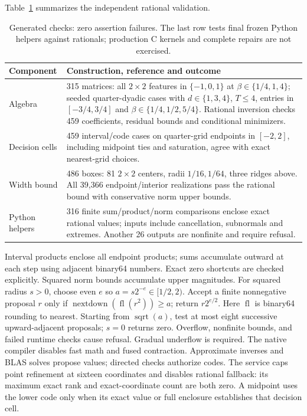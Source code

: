 \documentclass[11pt,a4paper]{article}
\makeatletter
\def\paragraph{\@startsection{paragraph}{4}{\z@}{1.5ex plus
   0.5ex minus .2ex}{-1em}{\normalsize\bf}}
\makeatother
\begin{document}
Table~\ref{tab:checks} summarizes the independent rational validation.
\begin{table}[t]
\centering\small
\begin{tabular}{@{}p{}p{}@{}}
\toprule
Component & Construction, reference and outcome \\
\midrule
Algebra & 315 matrices: all $2\!\times\!2$ features in $\{-1,0,1\}$ at
$\beta\in\{1/4,1,4\}$; seeded quarter-dyadic cases with $d\in\{1,3,4\}$,
$T\leq4$, entries in $[-3/4,3/4]$ and $\beta\in\{1/4,1/2,5/4\}$. Rational inversion checks 459 coefficients, residual bounds and
conditional minimizers. \\
Decision cells & 459 interval/code cases on quarter-grid endpoints in $[-2,2]$,
including midpoint ties and saturation, agree with exact nearest-grid choices. \\
Width bound & 486 boxes: 81 $2\!\times\!2$ centers, radii $1/16,1/64$, three
ridges above. All 39,366 endpoint/interior realizations pass the rational bound
with conservative norm upper bounds. \\
Python helpers & 316 finite sum/product/norm comparisons enclose exact rational
values; inputs include cancellation, subnormals and extremes. Another 26 outputs
are nonfinite and require refusal. \\
\bottomrule
\end{tabular}
\caption{Generated checks: zero assertion failures. The last row tests final
frozen Python helpers against rationals; production C kernels and complete
repairs are not exercised.}
\label{tab:checks}
\end{table}

\paragraph{Executable arithmetic.}
Interval products enclose all endpoint products; sums accumulate outward at each
step using adjacent binary64 numbers. Exact zero shortcuts are checked explicitly.
Squared norm bounds accumulate upper magnitudes. For squared radius $s>0$,
choose even $e$ so $a=s2^{-e}\in[1/2,2)$. Accept a finite nonnegative proposal
$r$ only if $\operatorname{nextdown}(\operatorname{fl}(r^2))\geq a$; return
$r2^{e/2}$. Here $\operatorname{fl}$ is binary64 rounding to nearest. Starting
from $\operatorname{sqrt}(a)$, test at most eight successive upward-adjacent
proposals; $s=0$ returns zero. Overflow, nonfinite
bounds, and failed runtime checks cause refusal. Gradual underflow is required.
The native compiler disables fast math and fused contraction. Approximate
inverses and BLAS solves propose values; directed checks authorize codes.
The service caps point refinement at sixteen coordinates and disables rational
fallback: its maximum exact rank and exact-coordinate count are both zero. A midpoint uses the lower code
only when its exact value or full enclosure establishes that decision cell.
\end{document}
